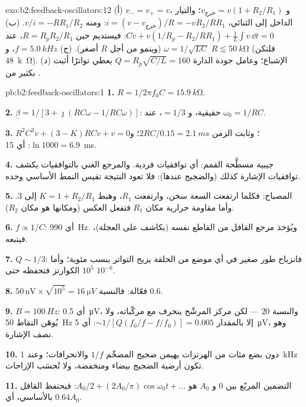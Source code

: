 \begin{solution}{exo:b2:feedback-oscillators:12}
(أ) $v_- = v_+ = v$، و $v_{\text{خرج}} = v(1 + R_2/R_1)$؛ والتيار الداخل إلى
الثنائي، $i = (v - v_{\text{خرج}})/R = -vR_2/RR_1$: ومنه $v/i = -RR_1/R_2$. (ب) $C\dot v +
v(1/R_p - R_2/RR_1) + \frac1L\int v\,\dd t = 0$: فيستديم حين $R = R_pR_2/R_1$،
عند $\omega = 1/\sqrt{LC}$ (وينمو من أجل $R$ أصغر). (ج) $f = \qty{5.0}{kHz}$، و $R \lesssim
\qty{50}{k\ohm}$ (فلتكن \qty{48}{k\ohm}). (د) الإشباع؛ وعامل جودة الدارة $Q = R_p
\sqrt{C/L} = 160$ يعطي تواترًا أثبت بكثير من .
\end{solution}

\begin{solution}{pb:b2:feedback-oscillators:1}
\textbf{1.} $R = 1/2\pi f_0C = \qty{15.9}{k\ohm}$.

\textbf{2.} $\underline\beta = 1/[3 + \jmath(RC\omega - 1/RC\omega)]$: حقيقية، و $= 1/3$، عند
$\omega_0 = 1/RC$.

\textbf{3.} $R^2C^2\ddot v + (3 - K)RC\dot v + v = 0$؛ وثابت الزمن $2RC/0.15 =
\qty{2.1}{ms}$؛ و $\ln1000 = 6.9$: أي \qty{15}{ms}.

\textbf{4.} جيبية مسطَّحة القمم: أي توافقيات فردية. والمرجع الغني
بالتوافقيات يكشف توافقيات الإشارة كذلك (والضجيج عندها):
فلا تعود النتيجة تقيس النمط الأساسي وحده.

\textbf{5.} المصباح: فكلما ارتفعت السعة سخن، وارتفعت $R_1$، وهبط
$K = 1 + R_2/R_1$ إلى $3$. وأما مقاومة حرارية مكان $R_1$ فتفعل
العكس (ومكانها هو مكان $R_2$).

\textbf{6.} $f \propto 1/C$: أي \qty{990}{Hz}. ويُؤخذ مرجع القافل من
القاطع نفسه (بكاشف على العجلة)، فيتبعه.

\textbf{7.} $Q \sim 1/3$: فانزياح طور صغير في أي موضع من الحلقة يزيح
التواتر بنسب مئوية؛ وأما $10^5$ الكوارتز فتحفظه حتى $10^{-6}$.

\textbf{8.} $50\,\text{nV} \times \sqrt{10^5} = \qty{16}{\micro V}$ فعّالة: فالنسبة $0.6$.

\textbf{9.} $B = \qty{100}{Hz}$: أي \qty{0.5}{\micro V}، والنسبة $20$ --- لكن مركز
المرشّح ينحرف مع مركّباته، ولا يُوهَن التقاط \qty{50}{Hz} إلا
بالمقدار $\sim 1/[Q(f_0/f - f/f_0)] = 0.005$: أي \qty{5}{\micro V}، وهو نصف
الإشارة.

\textbf{10.} دون بضع مئات من الهرتزات يهيمن ضجيج المضخّم $1/f$
والانحرافات؛ وعند \qty{1}{kHz} تكون أرضية الضجيج بيضاء ومنخفضة، ولا
تُحسَب الإزاحات.

\textbf{11.} التضمين المربّع بين $0$ و $A_0$ هو $A_0/2 + (2A_0/\pi)
\cos\omega_0t + \dots$: فيحتفظ القافل بالأساسي، أي $0.64A_0$.


\end{solution}
